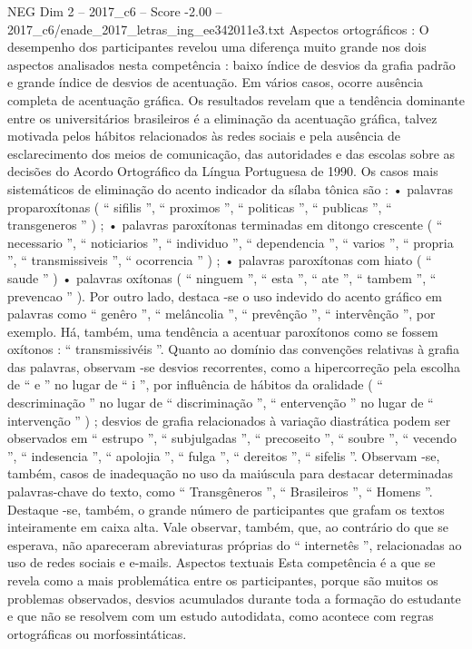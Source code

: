 \begin{textsample}{NEG Dim 2 – 2017\_c6 – Score -2.00 – 2017\_c6/enade\_2017\_letras\_ing\_ee342011e3.txt}
Aspectos ortográficos : O desempenho dos participantes revelou uma diferença muito grande nos dois aspectos analisados nesta competência : baixo índice de desvios da grafia padrão e grande índice de desvios de acentuação.
Em vários casos, ocorre ausência completa de acentuação gráfica.
Os resultados revelam que a tendência dominante entre os universitários brasileiros é a eliminação da acentuação gráfica, talvez motivada pelos hábitos relacionados às redes sociais e pela ausência de esclarecimento dos meios de comunicação, das autoridades e das escolas sobre as decisões do Acordo Ortográfico da Língua Portuguesa de 1990.
Os casos mais sistemáticos de eliminação do acento indicador da sílaba tônica são : • palavras proparoxítonas ( “ sifilis ”, “ proximos ”, “ politicas ”, “ publicas ”, “ transgeneros ” ) ; • palavras paroxítonas terminadas em ditongo crescente ( “ necessario ”, “ noticiarios ”, “ individuo ”, “ dependencia ”, “ varios ”, “ propria ”, “ transmissiveis ”, “ ocorrencia ” ) ; • palavras paroxítonas com hiato ( “ saude ” ) • palavras oxítonas ( “ ninguem ”, “ esta ”, “ ate ”, “ tambem ”, “ prevencao ” ).
Por outro lado, destaca -se o uso indevido do acento gráfico em palavras como “ genêro ”, “ melâncolia ”, “ prevênção ”, “ intervênção ”, por exemplo.
Há, também, uma tendência a acentuar paroxítonos como se fossem oxítonos : “ transmissivéis ”.
Quanto ao domínio das convenções relativas à grafia das palavras, observam -se desvios recorrentes, como a hipercorreção pela escolha de “ e ” no lugar de “ i ”, por influência de hábitos da oralidade ( “ descriminação ” no lugar de “ discriminação ”, “ entervenção ” no lugar de “ intervenção ” ) ; desvios de grafia relacionados à variação diastrática podem ser observados em “ estrupo ”, “ subjulgadas ”, “ precoseito ”, “ soubre ”, “ vecendo ”, “ indesencia ”, “ apolojia ”, “ fulga ”, “ dereitos ”, “ sifelis ”.
Observam -se, também, casos de inadequação no uso da maiúscula para destacar determinadas palavras-chave do texto, como “ Transgêneros ”, “ Brasileiros ”, “ Homens ”.
Destaque -se, também, o grande número de participantes que grafam os textos inteiramente em caixa alta.
Vale observar, também, que, ao contrário do que se esperava, não apareceram abreviaturas próprias do “ internetês ”, relacionadas ao uso de redes sociais e e-mails.
Aspectos textuais Esta competência é a que se revela como a mais problemática entre os participantes, porque são muitos os problemas observados, desvios acumulados durante toda a formação do estudante e que não se resolvem com um estudo autodidata, como acontece com regras ortográficas ou morfossintáticas.

\end{textsample}
